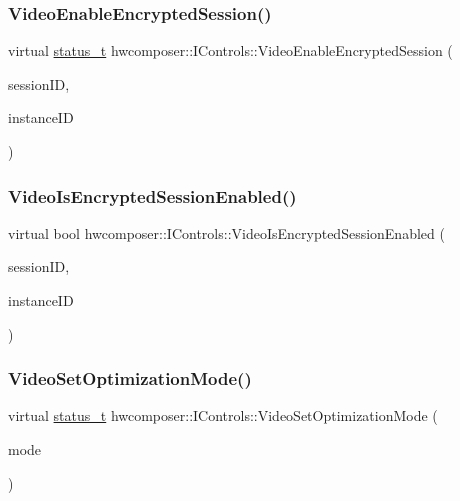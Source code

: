 \subsubsection{\texorpdfstring{Video\+Enable\+Encrypted\+Session()}{VideoEnableEncryptedSession()}}
{\footnotesize\ttfamily virtual \mbox{\hyperlink{hwcserviceapi_8h_a3806fb2027d9a316d8ca8d9b8b8eb96f}{status\+\_\+t}} hwcomposer\+::\+I\+Controls\+::\+Video\+Enable\+Encrypted\+Session (\begin{DoxyParamCaption}\item[{uint32\+\_\+t}]{session\+ID,  }\item[{uint32\+\_\+t}]{instance\+ID }\end{DoxyParamCaption})\hspace{0.3cm}{\ttfamily [pure virtual]}}

\mbox{\label{classhwcomposer_1_1IControls_a8a3368ae60a036bf5fa9ab5c3bdb9073}} 
\subsubsection{\texorpdfstring{Video\+Is\+Encrypted\+Session\+Enabled()}{VideoIsEncryptedSessionEnabled()}}
{\footnotesize\ttfamily virtual bool hwcomposer\+::\+I\+Controls\+::\+Video\+Is\+Encrypted\+Session\+Enabled (\begin{DoxyParamCaption}\item[{uint32\+\_\+t}]{session\+ID,  }\item[{uint32\+\_\+t}]{instance\+ID }\end{DoxyParamCaption})\hspace{0.3cm}{\ttfamily [pure virtual]}}

\mbox{\label{classhwcomposer_1_1IControls_a6ab5735df81c42f725641165136912f2}} 
\subsubsection{\texorpdfstring{Video\+Set\+Optimization\+Mode()}{VideoSetOptimizationMode()}}
{\footnotesize\ttfamily virtual \mbox{\hyperlink{hwcserviceapi_8h_a3806fb2027d9a316d8ca8d9b8b8eb96f}{status\+\_\+t}} hwcomposer\+::\+I\+Controls\+::\+Video\+Set\+Optimization\+Mode (\begin{DoxyParamCaption}\item[{\mbox{\hyperlink{hwcserviceapi_8h_a73044de23b8f474352d6753e21fca06d}{E\+Hwcs\+Optimization\+Mode}}}]{mode }\end{DoxyParamCaption})\hspace{0.3cm}{\ttfamily [pure virtual]}}

